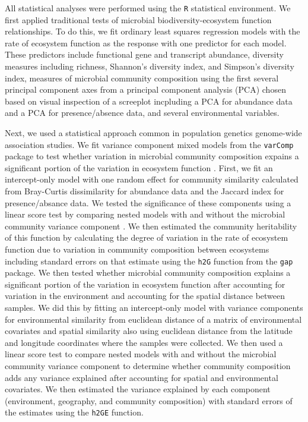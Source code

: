 \documentclass{article}
\begin{document}
All statistical analyses were performed using the \texttt{R} statistical
environment. 
We first applied traditional tests of microbial biodiversity-ecosystem function
relationships. To do this, we fit ordinary least squares regression models with
the rate of ecosystem function as the response with one predictor for each
model. These predictors include functional gene and transcript abundance,
diversity measures including richness, Shannon's diversity index, and Simpson's
diversity index, measures of microbial community composition using the first
several principal component axes from a principal component
analysis (PCA) chosen based on visual inspection of a screeplot incpluding a PCA for
abundance data and a PCA for presence/absence data, and several 
environmental variables. 

Next, we used a statistical approach common in population genetics genome-wide
association studies. We fit variance component mixed models from the
\texttt{varComp} package to test whether variation in microbial
community composition expains a significant portion of the variation in
ecosystem function \citep{qu2013}. First, we fit an intercept-only model with one random effect
for community similarity calculated from Bray-Curtis dissimilarity for abundance
data and the Jaccard index for presence/absance data. We tested the significance
of these components using a linear score test by comparing nested models with and
without the microbial community variance component \citep{qu2013}. We then estimated
the community heritability of this function by calculating the degree of
variation in the rate of ecosystem function due to variation in community
composition between ecosystems including standard errors on that estimate 
using the \texttt{h2G} function from the
\texttt{gap} package. We then tested whether microbial community composition explains a
significant portion of the variation in ecosystem function after accounting for
variation in the environment and accounting for the spatial distance between
samples. We did this by fitting an intercept-only model with variance components
for environmental similarity from euclidean distance of a matrix of
environmental covariates and spatial similarity
also using euclidean distance from the latitude and longitude coordinates where
the samples were collected. We then used a linear score test to compare
nested models with and without the microbial community variance component to
determine whether community composition adds any variance explained after
accounting for spatial and environmental covariates. We then estimated the
variance explained by each component (environment, geography, and community
composition) with standard errors of the estimates using the \texttt{h2GE}
function. 
\end{document}
